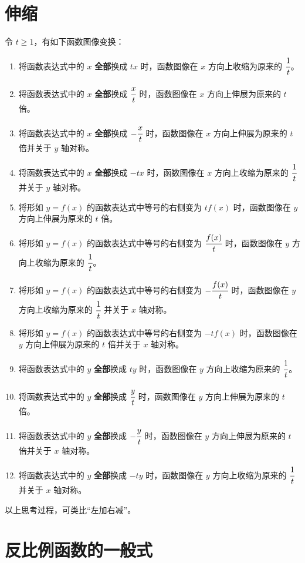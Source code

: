 \documentclass[a4paper]{article}
\begin{document}
\section{伸缩}

令 $t \geqslant 1$，有如下函数图像变换：

\begin{enumerate}[（1）]
	\item 将函数表达式中的 $x$ \textbf{全部}换成 $tx$ 时，函数图像在 $x$ 方向上收缩为原来的 $\cfrac{1}{t}$。
	\item 将函数表达式中的 $x$ \textbf{全部}换成 $\cfrac{x}{t}$ 时，函数图像在 $x$ 方向上伸展为原来的 $t$ 倍。
	\item 将函数表达式中的 $x$ \textbf{全部}换成 $-\cfrac{x}{t}$ 时，函数图像在 $x$ 方向上伸展为原来的 $t$ 倍并关于 $y$ 轴对称。
	\item 将函数表达式中的 $x$ \textbf{全部}换成 $-tx$ 时，函数图像在 $x$ 方向上收缩为原来的 $\cfrac{1}{t}$ 并关于 $y$ 轴对称。
	\item 将形如 $y = f(x)$ 的函数表达式中等号的右侧变为 $tf(x)$ 时，函数图像在 $y$ 方向上伸展为原来的 $t$ 倍。
	\item 将形如 $y = f(x)$ 的函数表达式中等号的右侧变为 $\cfrac{f(x)}{t}$ 时，函数图像在 $y$ 方向上收缩为原来的 $\cfrac{1}{t}$。
	\item 将形如 $y = f(x)$ 的函数表达式中等号的右侧变为 $-\cfrac{f(x)}{t}$ 时，函数图像在 $y$ 方向上收缩为原来的 $\cfrac{1}{t}$ 并关于 $x$ 轴对称。
	\item 将形如 $y = f(x)$ 的函数表达式中等号的右侧变为 $-tf(x)$ 时，函数图像在 $y$ 方向上伸展为原来的 $t$ 倍并关于 $x$ 轴对称。
	\item 将函数表达式中的 $y$ \textbf{全部}换成 $ty$ 时，函数图像在 $y$ 方向上收缩为原来的 $\cfrac{1}{t}$。
	\item 将函数表达式中的 $y$ \textbf{全部}换成 $\cfrac{y}{t}$ 时，函数图像在 $y$ 方向上伸展为原来的 $t$ 倍。
	\item 将函数表达式中的 $y$ \textbf{全部}换成 $-\cfrac{y}{t}$ 时，函数图像在 $y$ 方向上伸展为原来的 $t$ 倍并关于 $x$ 轴对称。
	\item 将函数表达式中的 $y$ \textbf{全部}换成 $-ty$ 时，函数图像在 $y$ 方向上收缩为原来的 $\cfrac{1}{t}$ 并关于 $x$ 轴对称。
\end{enumerate}

以上思考过程，可类比“左加右减”。

\section{反比例函数的一般式}
\end{document}
